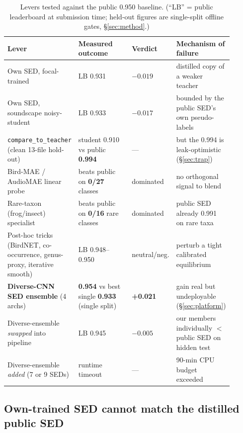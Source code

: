 \documentclass{ceurart}
\begin{document}
\begin{table}[t]
  \centering
  \caption{Levers tested against the public 0.950 baseline. (``LB'' = public
           leaderboard at submission time; held-out figures are single-split
           offline gates, \S\ref{sec:method}.)}
  \label{tab:levers}
  \small
  \begin{tabular}{@{}p{0.30\linewidth} p{0.24\linewidth} p{0.12\linewidth} p{0.24\linewidth}@{}}
    \toprule
    \textbf{Lever} & \textbf{Measured outcome} & \textbf{Verdict} & \textbf{Mechanism of failure} \\
    \midrule
    Own SED, focal-trained
      & LB 0.931
      & $-0.019$
      & distilled copy of a weaker teacher \\
    Own SED, soundscape noisy-student
      & LB 0.933
      & $-0.017$
      & bounded by the public SED's own pseudo-labels \\
    \texttt{compare\_to\_teacher} (clean 13-file hold-out)
      & student 0.910 vs public \textbf{0.994}
      & ---
      & but the 0.994 is leak-optimistic (\S\ref{sec:trap}) \\
    Bird-MAE / AudioMAE linear probe
      & beats public on \textbf{0/27} classes
      & dominated
      & no orthogonal signal to blend \\
    Rare-taxon (frog/insect) specialist
      & beats public on \textbf{0/16} rare classes
      & dominated
      & public SED already 0.991 on rare taxa \\
    Post-hoc tricks (BirdNET, co-occurrence, genus-proxy, iterative smooth)
      & LB 0.948--0.950
      & neutral/neg.
      & perturb a tight calibrated equilibrium \\
    \textbf{Diverse-CNN SED ensemble} (4 archs)
      & \textbf{0.954} vs best single \textbf{0.933} (single split)
      & \textbf{+0.021}
      & gain real but undeployable (\S\ref{sec:platform}) \\
    Diverse-ensemble \emph{swapped} into pipeline
      & LB 0.945
      & $-0.005$
      & our members individually $<$ public SED on hidden test \\
    Diverse-ensemble \emph{added} (7 or 9 SEDs)
      & runtime timeout
      & ---
      & 90-min CPU budget exceeded \\
    \bottomrule
  \end{tabular}
\end{table}

\subsection{Own-trained SED cannot match the distilled public SED}
\label{sec:ownsed}
\end{document}
